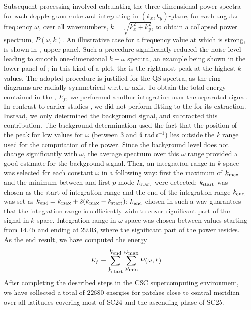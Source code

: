 \documentclass{aa}
\begin{document}
Subsequent processing involved calculating the 
three-dimensional
power spectra for each dopplergram cube and 
integrating
in $(k_x, k_y)$-plane, for each 
angular
frequency $\omega$,
over all wavenumbers, 
$k=\sqrt{k_x^2+k_y^2}$,
to obtain a collapsed power spectrum, $P(\omega,k)$. An illustrative case for a frequency
value at which \fff is strong, is shown in 
,
upper panel.
Such a procedure
significantly reduced the noise level leading to smooth one-dimensional $k-\omega$ spectra,
an example being shown in the lower panel of ;
in this kind of a plot, the \fff is the rightmost peak at the highest $k$ values.
The adopted procedure
is justified for the 
QS
spectra, as the ring diagrams are radially symmetrical w.r.t. $\omega$ axis. 
To obtain the total energy contained in the \fffns, $E_f$, we
performed another integration over the separated \fff signal.
In contrast to earlier studies \citep{SRB16,Waidele22}, we
did not perform fitting to the \fff for its extraction. 
Instead, we only determined the background signal, and subtracted this contribution.
The background determination used the fact that the position of the \fff peak for low values for $\omega$ (between 3 and 6 rad\,s$^{-1}$) lies outside the $k$ range used for the computation of the \fff power. Since the background level does not change significantly with $\omega$, the average spectrum over this $\omega$ range provided a good estimate for the background signal.
Then,
an integration range in $k$ space was selected for each constant $\omega$ in a following way: first the maximum of \fff $k_{\rm max}$ and the minimum between \fff and first $p$-mode $k_{\rm start}$ were detected; $k_{\rm start}$ was chosen as the start of integration range and the end of the integration range $k_{\rm end}$ was set as $k_{\rm end}=k_{\rm max}+2(k_{\rm max}-k_{\rm start})$; $k_{\rm end}$ chosen in such a way guarantees that the integration range is sufficiently wide to cover significant part of the \fff 
signal in $k$-space.
Integration range in $\omega$ space was chosen between values starting from 
14.45 and ending at 29.03, 
where the significant part of the \fff power resides. 
As the end result, we have computed the \fff energy
\begin{equation}
E_f=
\sum_{\mbox{$k_{\rm start}$}}^{\mbox{$k_{\rm end}$}}
\sum_{\mbox{$\omega_{\rm min}$}}^{\mbox{$\omega_{\rm max}$}} P(\omega,k)
\end{equation}
After completing the described steps in the CSC supercomputing
environment, we have collected a total of 
22680
\fff
energies
for patches close to central meridian over all latitudes covering 
most of SC24 and the ascending phase of SC25.
\end{document}
